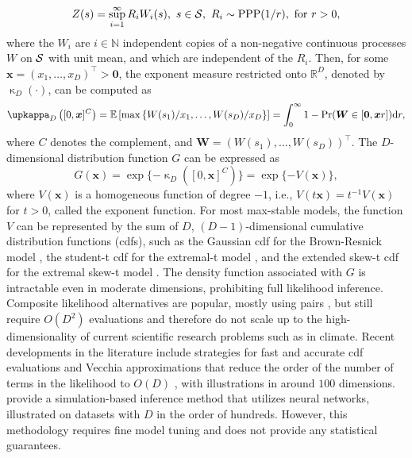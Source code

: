 \documentclass[lineno]{biometrika}
\begin{document}
\begin{equation}\label{eq:spectralrepresentation}
	Z(s) = \sup_{i=1}^\infty R_iW_i(s),\ s\in{\mathcal{S}}, \ R_i \sim \text{PPP}(1/r),\ \text{for}\  r > 0,
\end{equation}
where the $W_i$ are $i\in\mathbb N$ independent copies of a non-negative continuous processes $W$ on ${\mathcal{S}}$ with unit mean, and 
which are independent of the $R_i$.
Then, for some ${\bm x} = \left(x_1, \ldots, x_D \right)^\top > {\bm 0}$, the exponent measure restricted onto $\mathbb R^D$, denoted by $\upkappa_D(\cdot)$, can be computed as 
\begin{equation}\label{eq:exponentmeasure}
\upkappa_D\left([0,\bm x]^C\right)=\mathbb E\left[\max\left\{W(s_1)/x_1,\dots,W(s_D)/x_D \right\} \right] = \int_0^\infty 1 - \Pr(\bm W \in [\bm 0,\bm xr ])\text dr,	
\end{equation}
where $C$ denotes the complement, and $\bm W=(W(s_1),\dots,W(s_D))^\top$. The $D$-dimensional distribution function $G$ can be expressed as
\begin{equation}\label{eq:ppp}
G(\bm x) = \exp\{-\upkappa_D([0,\bm x]^C)\} = \exp\{-V(\bm x)\},
\end{equation}
where $V(\bm x)$ is a homogeneous function of degree $-1$, i.e., $V(t \bm x)=t^{-1}V(\bm x)$ for $t>0$, called the exponent function. 
%
For most max-stable models, the function $V$ can be represented by the sum of $D$, $(D-1)$-dimensional cumulative distribution functions (cdfs), such as the Gaussian cdf for the Brown-Resnick model \citep{Huser.Davison:2013a}, the student-t cdf for the extremal-t model \citep{Thibaud.Opitz:2015}, and the extended skew-t cdf for the extremal skew-t model \citep{Beranger.etal:2017}. The density function associated with $G$ is intractable even in moderate dimensions, prohibiting full likelihood inference. 
Composite likelihood alternatives are popular, mostly using pairs \citep{Padoan.etal:2010, Davison.etal:2012}, but still require $O(D^2)$ evaluations and therefore do not scale up to the high-dimensionality of current scientific research problems such as in climate. 
 Recent developments in the literature include strategies for fast and accurate cdf evaluations \citep{Beranger.etal:2021, deFondeville.Davison:2018} and Vecchia approximations that reduce the order of the number of terms in the likelihood to $O(D)$ \citep{Huser.Zhong:2023}, with illustrations in around $100$ dimensions. \citet{Sainsbury.Zammit.Huser:2024} provide a simulation-based inference method that utilizes neural networks, illustrated on datasets with $D$ in the order of hundreds. However, this methodology requires fine model tuning and does not provide any statistical guarantees. 
\end{document}
